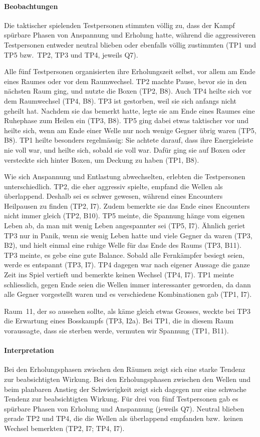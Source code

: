 \documentclass[../Main.tex]{subfiles}
\begin{document}
\paragraph{Beobachtungen}
Die taktischer spielenden Testpersonen stimmten völlig zu, dass der Kampf spürbare Phasen von Anspannung und Erholung hatte, während die aggressiveren Testpersonen entweder neutral blieben oder ebenfalls völlig zustimmten (TP1 und TP5 bzw.\ TP2, TP3 und TP4, jeweils Q7).

Alle fünf Testpersonen organisierten ihre Erholungszeit selbst, vor allem am Ende eines Raumes oder vor dem Raumwechsel. TP2 machte Pause, bevor sie in den nächsten Raum ging, und nutzte die Boxen (TP2, B8). Auch TP4 heilte sich vor dem Raumwechsel (TP4, B8). TP3 ist gestorben, weil sie sich anfangs nicht geheilt hat. Nachdem sie das bemerkt hatte, legte sie am Ende eines Raumes eine Ruhephase zum Heilen ein (TP3, B8). TP5 ging dabei etwas taktischer vor und heilte sich, wenn am Ende einer Welle nur noch wenige Gegner übrig waren (TP5, B8). TP1 heilte besonders regelmässig: Sie achtete darauf, dass ihre Energieleiste nie voll war, und heilte sich, sobald sie voll war. Dafür ging sie auf Boxen oder versteckte sich hinter Boxen, um Deckung zu haben (TP1, B8).

Wie sich Anspannung und Entlastung abwechselten, erlebten die Testpersonen unterschiedlich. TP2, die eher aggressiv spielte, empfand die Wellen als überlappend. Deshalb sei es schwer gewesen, während eines Encounters Heilpausen zu finden (TP2, I7). Zudem bemerkte sie das Ende eines Encounters nicht immer gleich (TP2, B10). TP5 meinte, die Spannung hänge vom eigenen Leben ab, da man mit wenig Leben angespannter sei (TP5, I7). Ähnlich geriet TP3 nur in Panik, wenn sie wenig Leben hatte und viele Gegner da waren (TP3, B2), und hielt einmal eine ruhige Welle für das Ende des Raums (TP3, B11). TP3 meinte, es gebe eine gute Balance. Sobald alle Fernkämpfer besiegt seien, werde es entspannt (TP3, I7). TP4 dagegen war nach eigener Aussage die ganze Zeit ins Spiel vertieft und bemerkte keinen Wechsel (TP4, I7). TP1 meinte schliesslich, gegen Ende seien die Wellen immer interessanter geworden, da dann alle Gegner vorgestellt waren und es verschiedene Kombinationen gab (TP1, I7).

Raum~11, der so aussehen sollte, als käme gleich etwas Grosses, weckte bei TP3 die Erwartung eines Bosskampfs (TP3, I2a). Bei TP1, die in diesem Raum voraussagte, dass sie sterben werde, vermuten wir Spannung (TP1, B11).

\paragraph{Interpretation}
Bei den Erholungsphasen zwischen den Räumen zeigt sich eine starke Tendenz zur beabsichtigten Wirkung. Bei den Erholungsphasen zwischen den Wellen und beim planbaren Anstieg der Schwierigkeit zeigt sich dagegen nur eine schwache Tendenz zur beabsichtigten Wirkung. Für drei von fünf Testpersonen gab es spürbare Phasen von Erholung und Anspannung (jeweils Q7). Neutral blieben gerade TP2 und TP4, die die Wellen als überlappend empfanden bzw.\ keinen Wechsel bemerkten (TP2, I7; TP4, I7).
\end{document}
